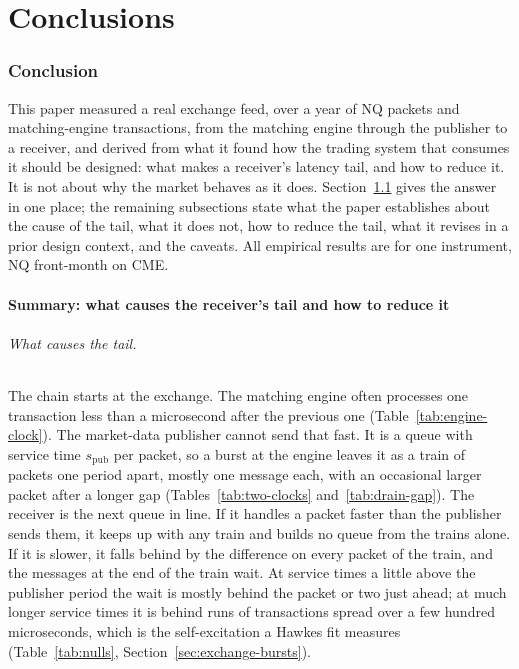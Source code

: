 \documentclass[11pt]{article}
\newcommand{\spub}{s_{\mathrm{pub}}}
\begin{document}

\clearpage
\part{Conclusions}

\section{Conclusion}
\label{sec:conclusion}

This paper measured a real exchange feed, over a year of NQ packets and matching-engine
transactions, from the matching engine through the publisher to a receiver, and derived
from what it found how the trading system that consumes it should be designed: what makes a
receiver's latency tail, and how to reduce it. It is not about why the market behaves as
it does. Section~\ref{sec:concl-summary} gives the answer in one place;
the remaining subsections state what the paper establishes about the cause of the tail,
what it does not, how to reduce the tail, what it revises in a prior design context, and
the caveats. All empirical results are for one instrument, NQ front-month on CME.

\subsection{Summary: what causes the receiver's tail and how to reduce it}
\label{sec:concl-summary}

\paragraph{What causes the tail.} The chain starts at the exchange. The matching engine
often processes one transaction less than a microsecond after the previous one
(Table~\ref{tab:engine-clock}). The market-data publisher cannot send that fast. It is a
queue with service time $\spub$ per packet, so a burst at the engine
leaves it as a train of packets one period apart, mostly one message each, with an
occasional larger packet after a longer gap (Tables~\ref{tab:two-clocks}
and~\ref{tab:drain-gap}). The receiver is the next queue in line. If it handles a packet
faster than the publisher sends them, it keeps up with any train and builds no queue from
the trains alone. If it is slower, it falls behind by the difference on every packet of the
train, and the messages at the end of the train wait. At service times a little above the
publisher period the wait is mostly behind the packet or two just ahead; at much longer
service times it is behind runs of transactions spread over a few hundred microseconds,
which is the self-excitation a Hawkes fit measures (Table~\ref{tab:nulls},
Section~\ref{sec:exchange-bursts}).
\end{document}
